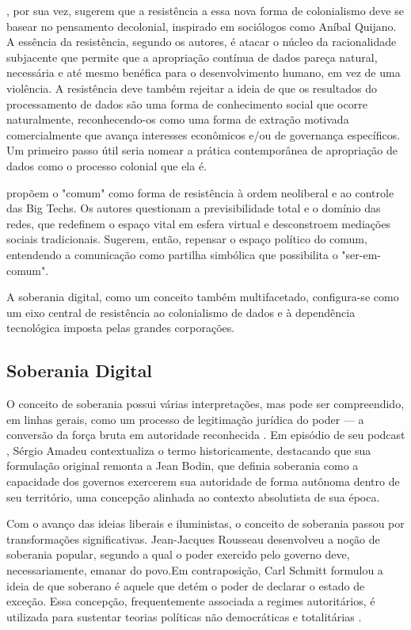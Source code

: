 , por sua vez, sugerem que a resistência a essa nova forma de colonialismo deve se basear no pensamento decolonial, inspirado em sociólogos como Aníbal Quijano. A essência da resistência, segundo os autores, é atacar o núcleo da racionalidade subjacente que permite que a apropriação contínua de dados pareça natural, necessária e até mesmo benéfica para o desenvolvimento humano, em vez de uma violência. A resistência deve também rejeitar a ideia de que os resultados do processamento de dados são uma forma de conhecimento social que ocorre naturalmente, reconhecendo-os como uma forma de extração motivada comercialmente que avança interesses econômicos e/ou de governança específicos. Um primeiro passo útil seria nomear a prática contemporânea de apropriação de dados como o processo colonial que ela é.

 propõem o "comum" como forma de resistência à ordem neoliberal e ao controle das Big Techs. Os autores questionam a previsibilidade total e o domínio das redes, que redefinem o espaço vital em esfera virtual e desconstroem mediações sociais tradicionais. Sugerem, então, repensar o espaço político do comum, entendendo a comunicação como partilha simbólica que possibilita o "ser-em-comum".

A soberania digital, como um conceito também multifacetado, configura-se como um eixo central de resistência ao colonialismo de dados e à dependência tecnológica imposta pelas grandes corporações.

\subsection{Soberania Digital}
\label{subsec:soberania}
O conceito de soberania possui várias interpretações, mas pode ser compreendido, em linhas gerais, como um processo de legitimação jurídica do poder — a conversão da força bruta em autoridade reconhecida \cite{lemos2024}. Em episódio de seu podcast , Sérgio Amadeu contextualiza o termo historicamente, destacando que sua formulação original remonta a Jean Bodin, que definia soberania como a capacidade dos governos exercerem sua autoridade de forma autônoma dentro de seu território, uma concepção alinhada ao contexto absolutista de sua época.

Com o avanço das ideias liberais e iluministas, o conceito de soberania passou por transformações significativas. Jean-Jacques Rousseau desenvolveu a noção de soberania popular, segundo a qual o poder exercido pelo governo deve, necessariamente, emanar do povo.Em contraposição, Carl Schmitt formulou a ideia de que soberano é aquele que detém o poder de declarar o estado de exceção. Essa concepção, frequentemente associada a regimes autoritários, é utilizada para sustentar teorias políticas não democráticas e totalitárias \cite{tecnopolitica2023}.


